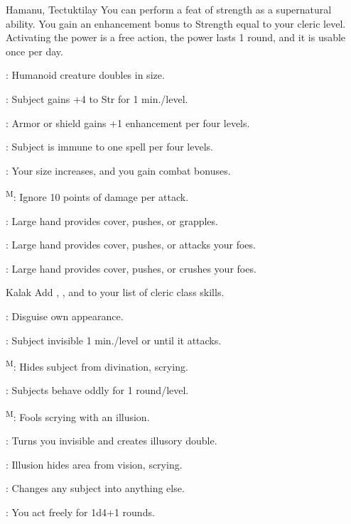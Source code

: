 {Hamanu, Tectuktilay}
{You can perform a feat of strength as a supernatural ability. You gain an enhancement bonus to Strength equal to your cleric level. Activating the power is a free action, the power lasts 1 round, and it is usable once per day.}
{
	\item {}: Humanoid creature doubles in size.
	\item {}: Subject gains +4 to Str for 1 min./level.
	\item {}: Armor or shield gains +1 enhancement per four levels.
	\item {}: Subject is immune to one spell per four levels.
	\item {}: Your size increases, and you gain combat bonuses.
	\item {}\textsuperscript{M}: Ignore 10 points of damage per attack.
	\item {}: Large hand provides cover, pushes, or grapples.
	\item {}: Large hand provides cover, pushes, or attacks your foes.
	\item {}: Large hand provides cover, pushes, or crushes your foes.
}


{Kalak}
{Add , , and  to your list of cleric class skills.}
{
	\item {}: Disguise own appearance.
	\item {}: Subject invisible 1 min./level or until it attacks.
	\item {}\textsuperscript{M}: Hides subject from divination, scrying.
	\item {}: Subjects behave oddly for 1 round/level.
	\item {}\textsuperscript{M}: Fools scrying with an illusion.
	\item {}: Turns you invisible and creates illusory double.
	\item {}: Illusion hides area from vision, scrying.
	\item {}: Changes any subject into anything else.
	\item {}: You act freely for 1d4+1 rounds.
}


